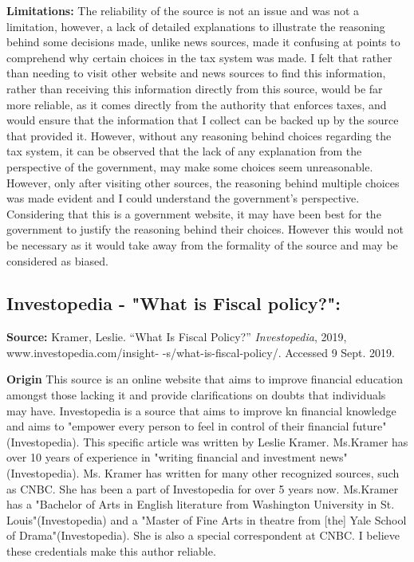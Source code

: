 \documentclass[12pt, a4paper]{article}
\begin{document}
			
			\textbf{Limitations:}
			\newline
			The reliability of the source is not an issue and was not a limitation, however, a lack of detailed explanations to illustrate the reasoning behind some decisions made, unlike news sources, made it confusing at points to comprehend why certain choices in the tax system was made. I felt that rather than needing to visit other website and news sources to find this information, rather than receiving this information directly from this source, would be far more reliable, as it comes directly from the authority that enforces taxes, and would ensure that the information that I collect can be backed up by the source that provided it. However, without any reasoning behind choices regarding the tax system, it can be observed that the lack of any explanation from the perspective of the government, may make some choices seem unreasonable. However, only after visiting other sources, the reasoning behind multiple choices was made evident and I could understand the government's perspective. Considering that this is a government website, it may have been best for the government to justify the reasoning behind their choices. However this would not be necessary as it would take away from the formality of the source and may be considered as biased.
		\subsection{Investopedia - "What is Fiscal policy?":}
			\textbf{Source:}
			\newline
			Kramer, Leslie. “What Is Fiscal Policy?” \textit{Investopedia}, 2019, www.investopedia.com/insight-
			-s/what-is-fiscal-policy/. Accessed 9 Sept. 2019.
			\newline
			
			\textbf{Origin}
			\newline
			This source is an online website that aims to improve financial education amongst those lacking it and provide clarifications on doubts that individuals may have. Investopedia is a source that aims to improve kn financial knowledge and aims to "empower every person to feel in control of their financial future"(Investopedia). This specific article was written by Leslie Kramer. Ms.Kramer has over 10 years of experience in "writing financial and investment news"(Investopedia). Ms. Kramer has written for many other recognized sources, such as CNBC. She has been a part of Investopedia for over 5 years now. Ms.Kramer has a "Bachelor of Arts in English literature from Washington University in St. Louis"(Investopedia) and a "Master of Fine Arts in theatre from [the] Yale School of Drama"(Investopedia). She is also a special correspondent at CNBC. I believe these credentials make this author reliable.
			\newline
			
\end{document}
